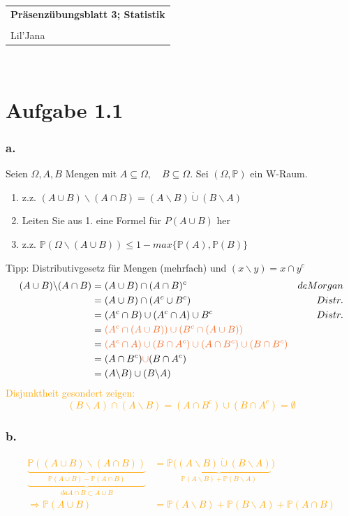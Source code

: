 \documentclass{article} %
\newcommand{\titulo}{Präsenzübungsblatt 3; Statistik}
\newcommand{\nombre}{Lil'Jana}
\newcommand{\p}[0]{\mathbb{P}}
\begin{document}
\begin{tabular}{p{12cm}}
{{\Large\bf\titulo}}\\
\vspace{0.2cm}\\
 {\large\nombre}\\
\end{tabular}
\vspace{0.2cm}\\
\section{Aufgabe 1.1}
\subsubsection{a.}
Seien $\Omega, A, B$ Mengen mit $A \subseteq \Omega, \quad B \subseteq \Omega$. Sei $(\Omega, \mathbb{P})$ ein W-Raum. 
\begin{enumerate}
    \item z.z. $(A \cup B)\backslash (A \cap B) = (A \backslash B) \dot\cup (B \backslash A)$
    \item Leiten Sie aus 1. eine Formel für $P(A\cup B)$ her 
    \item z.z. $\mathbb{P}(\Omega \backslash (A \cup B)) \leq 1 - max \{\mathbb{P}(A), \mathbb{P}(B)\}$
\end{enumerate}
Tipp: Distributivgesetz für Mengen (mehrfach) und $(x\backslash y) = x \cap y^c$
\begin{align*}
    (A \cup B)\backslash (A \cap B) & = (A \cup B)\cap (A \cap B)^c & de Morgan \\
    & = (A \cup B)\cap (A^c \cup B^c) & Distr. \\
    & = (A^c \cap B) \cup (A^c \cap A) \cup B^c & Distr. \\
     & =\textcolor{Orange}{ (A^c \cap (A \cup B)) \cup (B^c \cap (A \cup B))}   \\
     & = \textcolor{Orange}{(A^c \cap A) \cup (B \cap A^c) \cup (A \cap B^c) \cup (B \cap B^c)} \\
      & = (A \cap B^c) \textcolor{Orange}{ \cup } (B \cap A^c) \\
      & = (A \backslash B) \cup (B \backslash A)
\end{align*}
\textcolor{Orange}{Disjunktheit gesondert zeigen: 
\[(B \backslash A) \cap (A \backslash B) = (A \cap B^c) \cup (B \cap A^c) = \emptyset \]}
\subsubsection{b.}
\textcolor{Orange}{
\begin{align*}
 \underbrace{ \underbrace{  \p((A \cup B) \backslash (A \cap B) )}_{\p(A \cup B) - \p (A \cap B) }}_{da A \cap B \subset A \cup B} & = \underbrace{\p ((A \backslash B)\dot\cup (B \backslash A)}_{\p (A \backslash B) + \p(B \backslash A) }  ) \\
 \Rightarrow  \p(A\cup B) & = \p(A \backslash B) + \p (B \backslash A) + \p (A \cap B) 
\end{align*}
}
\end{document}
